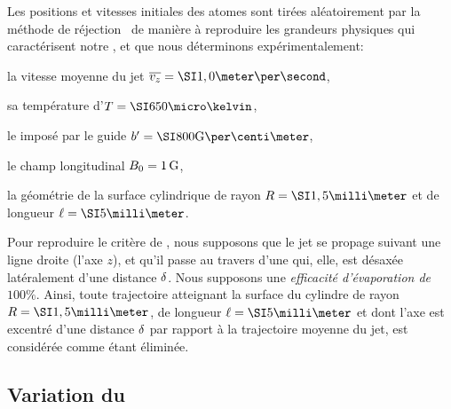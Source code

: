 \noindent Les positions et vitesses initiales des atomes sont tirées aléatoirement par la méthode de réjection~\cite{PTV92} de manière à reproduire les grandeurs physiques qui caractérisent notre \jat, et que nous déterminons expérimentalement:
\begin{itemizel}
	\item la vitesse moyenne du jet $\vjet=\mps{1,0}$,
	\item sa température d'\eqthdy $T=\microK{650}$,
	\item le \gtchm imposé par le guide $\gradB=\gausspcm{800}$,
	\item le champ longitudinal ${B_0}=\SI{1}{{\rm G}}$,
	\item la géométrie de la surface cylindrique de rayon $\CeramRay=\mm{1,5}$ et de longueur $\CeramLong=\mm{5}$.
\end{itemizel}
Pour reproduire le critère de \fispse, nous supposons que le jet se propage suivant une ligne droite (l'axe $z$), et qu'il passe au travers d'une \pdec qui, elle, est désaxée latéralement d'une distance ${\delta}$. 
Nous supposons une \emph{efficacité d'évaporation de $100\%$}. Ainsi, toute trajectoire atteignant la surface du cylindre de rayon $\CeramRay=\mm{1,5}$, de longueur $\CeramLong=\mm{5}$ et dont l'axe est excentré d'une distance ${\delta}$ par rapport à la trajectoire moyenne du jet, est considérée comme étant éliminée.


\casse


\subsection{Variation du \fat}


